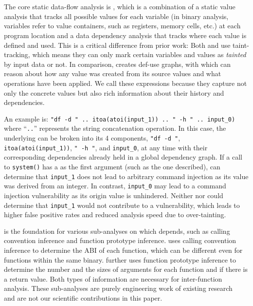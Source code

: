 \section{\rda}
\label{sec:rda}

The core static data-flow analysis is \rda, which is a combination of a static value analysis that tracks all possible values for each variable (in binary analysis, variables refer to value containers, such as registers, memory cells, etc.) at each program location and a data dependency analysis that tracks where each value is defined and used.
This is a critical difference from prior work:
Both \karonte and \satc use taint-tracking, which means they can only mark certain variables and values as \emph{tainted} by input data or not.
In comparison, \rda creates def-use graphs, with which \mango can reason about how any value was created from its source values and what operations have been applied.
We call these expressions \emph{\richexprs} because they capture not only the concrete values but also rich information about their history and dependencies.

An example \richexpr is: \texttt{"df -d " .. itoa(atoi(input\_1)) .. " -h " .. input\_0)} where ``\texttt{..}'' represents the string concatenation operation.
In this case, the underlying \richexpr can be broken into its 4 components, \texttt{"df -d "}, \texttt{itoa(atoi(input\_1))}, \texttt{" -h "}, and \texttt{input\_0}, at any time with their corresponding dependencies already held in a global dependency graph.
If a call to \texttt{system()} has a \richexpr as the first argument (such as the one described), \mango can determine that \texttt{input\_1} does not lead to arbitrary command injection as its value was derived from an integer. 
In contrast, \texttt{input\_0} may lead to a command injection vulnerability as its origin value is unhindered.
Neither \karonte nor \satc could determine that \texttt{input\_1} would not contribute to a vulnerability, which leads to higher false positive rates and reduced analysis speed due to over-tainting.

\rda is the foundation for various sub-analyses on which \mango depends, such as calling convention inference and function prototype inference.
    \mango uses calling convention inference to determine the ABI of each function, which can be different even for functions within the same binary.
    \mango further uses function prototype inference to determine the number and the sizes of arguments for each function and if there is a return value.
    Both types of information are necessary for inter-function analysis.
    These sub-analyses are purely engineering work of existing research~\cite{balakrishnan2004analyzing,zhang2007parameter} and are not our scientific contributions in this paper.

